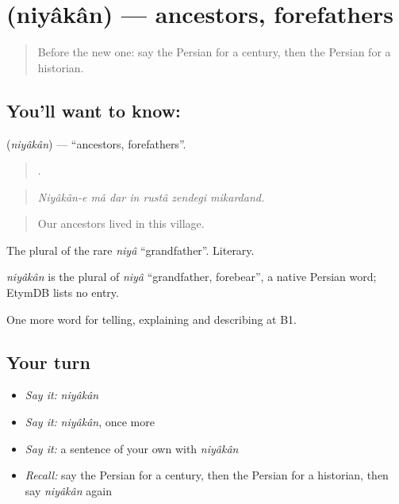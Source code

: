\section[\texorpdfstring{\fa{نیاکان} (niyâkân)}{نیاکان (niyâkân)}]{ (niyâkân) — ancestors, forefathers}

\label{lesson:FA-C353-niyakan}



\begin{quote}
Before the new one: say the Persian for a century, then the Persian for a historian.
\end{quote}

\subsection*{You'll want to know: }
\textbf{} (\emph{niyâkân}) — \textquotedblleft{}ancestors, forefathers\textquotedblright{}.

\begin{quote}
      .
\end{quote}

\begin{quote}
\emph{Niyâkân-e mâ dar in rustâ zendegi mikardand.}
\end{quote}

\begin{quote}
Our ancestors lived in this village.
\end{quote}

The plural of the rare \emph{niyâ} \textquotedblleft{}grandfather\textquotedblright{}. Literary.

\begin{cousinweb}
\emph{niyâkân} is the plural of \emph{niyâ} \textquotedblleft{}grandfather, forebear\textquotedblright{}, a native Persian word; EtymDB lists no entry.
\end{cousinweb}

\begin{grammarlens}[title={What you've built}]
One more word for telling, explaining and describing at B1.
\end{grammarlens}

\subsection*{Your turn}
\begin{itemize}
\raggedright
  \item \emph{Say it:} \emph{niyâkân}
  \item \emph{Say it:} \emph{niyâkân}, once more
  \item \emph{Say it:} a sentence of your own with \emph{niyâkân}
  \item \emph{Recall:} say the Persian for a century, then the Persian for a historian, then say \emph{niyâkân} again
\end{itemize}

